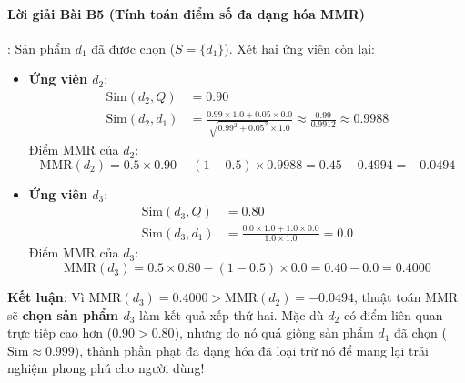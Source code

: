 \paragraph{Lời giải Bài B5 (Tính toán điểm số đa dạng hóa MMR)}:
Sản phẩm $d_1$ đã được chọn ($S = \{d_1\}$).
Xét hai ứng viên còn lại:
\begin{itemize}
  \item \textbf{Ứng viên $d_2$}:
  \begin{align*}
  \text{Sim}(d_2, Q) &= 0.90 \\
  \text{Sim}(d_2, d_1) &= \frac{0.99 \times 1.0 + 0.05 \times 0.0}{\sqrt{0.99^2 + 0.05^2} \times 1.0} \approx \frac{0.99}{0.9912} \approx 0.9988
  \end{align*}
  Điểm MMR của $d_2$:
  \begin{equation*}
  \text{MMR}(d_2) = 0.5 \times 0.90 - (1 - 0.5) \times 0.9988 = 0.45 - 0.4994 = \mathbf{-0.0494}
  \end{equation*}

  \item \textbf{Ứng viên $d_3$}:
  \begin{align*}
  \text{Sim}(d_3, Q) &= 0.80 \\
  \text{Sim}(d_3, d_1) &= \frac{0.0 \times 1.0 + 1.0 \times 0.0}{1.0 \times 1.0} = 0.0
  \end{align*}
  Điểm MMR của $d_3$:
  \begin{equation*}
  \text{MMR}(d_3) = 0.5 \times 0.80 - (1 - 0.5) \times 0.0 = 0.40 - 0.0 = \mathbf{0.4000}
  \end{equation*}
\end{itemize}
\textbf{Kết luận}:
Vì $\text{MMR}(d_3) = 0.4000 > \text{MMR}(d_2) = -0.0494$, thuật toán MMR sẽ \textbf{chọn sản phẩm $d_3$} làm kết quả xếp thứ hai.
Mặc dù $d_2$ có điểm liên quan trực tiếp cao hơn ($0.90 > 0.80$), nhưng do nó quá giống sản phẩm $d_1$ đã chọn ($\text{Sim} \approx 0.999$), thành phần phạt đa dạng hóa đã loại trừ nó để mang lại trải nghiệm phong phú cho người dùng!

